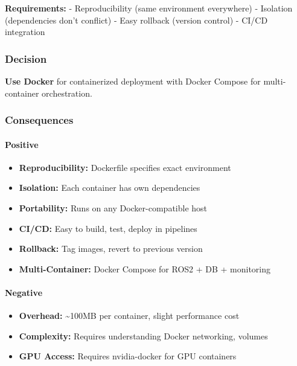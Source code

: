 \documentclass[
]{article}
\providecommand{\tightlist}{%
  \setlength{\itemsep}{0pt}\setlength{\parskip}{0pt}}
\begin{document}
\textbf{Requirements:} - Reproducibility (same environment everywhere) -
Isolation (dependencies don't conflict) - Easy rollback (version
control) - CI/CD integration

\hypertarget{decision-8}{%
\subsubsection{Decision}\label{decision-8}}

\textbf{Use Docker} for containerized deployment with Docker Compose for
multi-container orchestration.

\hypertarget{consequences-8}{%
\subsubsection{Consequences}\label{consequences-8}}

\hypertarget{positive-8}{%
\paragraph{Positive}\label{positive-8}}

\begin{itemize}
\tightlist
\item
  \textbf{Reproducibility:} Dockerfile specifies exact environment
\item
  \textbf{Isolation:} Each container has own dependencies
\item
  \textbf{Portability:} Runs on any Docker-compatible host
\item
  \textbf{CI/CD:} Easy to build, test, deploy in pipelines
\item
  \textbf{Rollback:} Tag images, revert to previous version
\item
  \textbf{Multi-Container:} Docker Compose for ROS2 + DB + monitoring
\end{itemize}

\hypertarget{negative-8}{%
\paragraph{Negative}\label{negative-8}}

\begin{itemize}
\tightlist
\item
  \textbf{Overhead:} \textasciitilde100MB per container, slight
  performance cost
\item
  \textbf{Complexity:} Requires understanding Docker networking, volumes
\item
  \textbf{GPU Access:} Requires nvidia-docker for GPU containers
\end{itemize}
\end{document}
